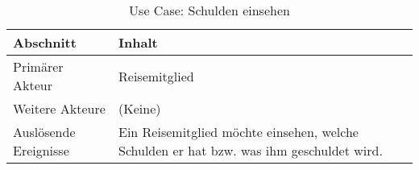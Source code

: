 \begin{table}[H]
	\footnotesize
	\caption{Use Case: Schulden einsehen}
	\begin{tabularx}{0.95\textwidth}{ |l|X| }
		\hline
		\rowcolor{gray} \textbf{Abschnitt}     & \textbf{Inhalt}                                                                                                                        \\
		\hline
		Primärer Akteur                        & Reisemitglied                                                                                                                          \\
		\hline
		Weitere Akteure                        & (Keine)                                                                                                                                \\
		\hline
		Auslösende Ereignisse                  & Ein Reisemitglied möchte einsehen, welche Schulden er hat bzw. was ihm geschuldet wird.                                                \\


\end{tabularx}
\end{table}

